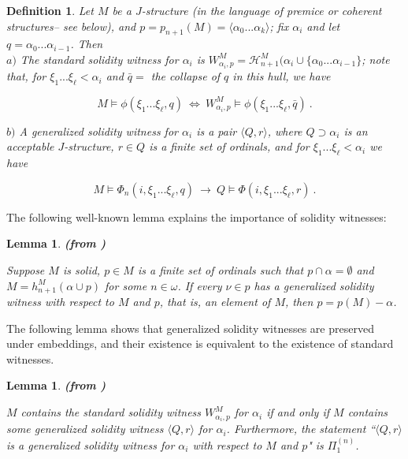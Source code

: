 \documentclass[12pt]{article}
\newtheorem{lem}[thm]{Lemma}
\newtheorem{defn}[thm]{Definition}
\begin{document}
\begin{defn} \label{solidity witness}
Let $M$ be a $J$-structure (in the language of premice or coherent structures-- see below), and $p = p_{n+1} (M) = \langle \alpha_0 ... \alpha_k \rangle$; fix $\alpha_i$ and let $q = \alpha_0 ... \alpha_{i-1}$.  Then\\

$a)$ The standard solidity witness for $\alpha_i$ is $W_{\alpha_i , p}^M = \mathcal{H}_{n+1}^M ( \alpha_i \cup \{ \alpha_0 ... \alpha_{i-1} \}$; note that, for $\xi_1 ... \xi_\ell < \alpha_i$ and $\bar{q} = $ the collapse of $q$ in this hull, we have

\[
M \models \phi ( \xi_1 ... \xi_\ell , q) \ \Leftrightarrow \ W_{\alpha_i , p}^M \models \phi ( \xi_1 ... \xi_\ell , \bar{q}) \ .
\]

$b)$ A generalized solidity witness for $\alpha_i$ is a pair $\langle Q , r \rangle$, where $Q \supset \alpha_i$ is an acceptable $J$-structure, $r \in Q$ is a finite set of ordinals, and for $\xi_1 ... \xi_\ell < \alpha_i$ we have

\[
M \models \Phi_n ( i, \xi_1 ... \xi_\ell , q ) \  \rightarrow \ Q \models \Phi (i, \xi_1 ... \xi_\ell , r ) \ .
\]

\end{defn}

The following well-known lemma explains the importance of solidity witnesses:

\begin{lem}
\textbf{(from \cite{zeman book})}

Suppose $M$ is solid, $p \in M$ is a finite set of ordinals such that $p \cap \alpha = \emptyset$ and $M = h_{n+1}^M ( \alpha \cup p )$ for some $n \in \omega$.  If every $\nu \in p$ has a generalized solidity witness with respect to $M$ and $p$, that is, an element of $M$, then $p = p (M) - \alpha$.
\end{lem}

\smallskip

The following lemma shows that generalized solidity witnesses are preserved under embeddings, and their existence is equivalent to the existence of standard witnesses.\\

\begin{lem}
\textbf{(from \cite{zeman book})}

$M$ contains the standard solidity witness $W_{\alpha_i , p}^M$ for $\alpha_i$ if and only if $M$ contains some generalized solidity witness $\langle Q , r \rangle$ for $\alpha_i$.  Furthermore, the statement ``$\langle Q , r \rangle$ is a generalized solidity witness for $\alpha_i$ with respect to $M$ and $p$" is $\Pi_1^{(n)}$.
\end{lem}
\end{document}

